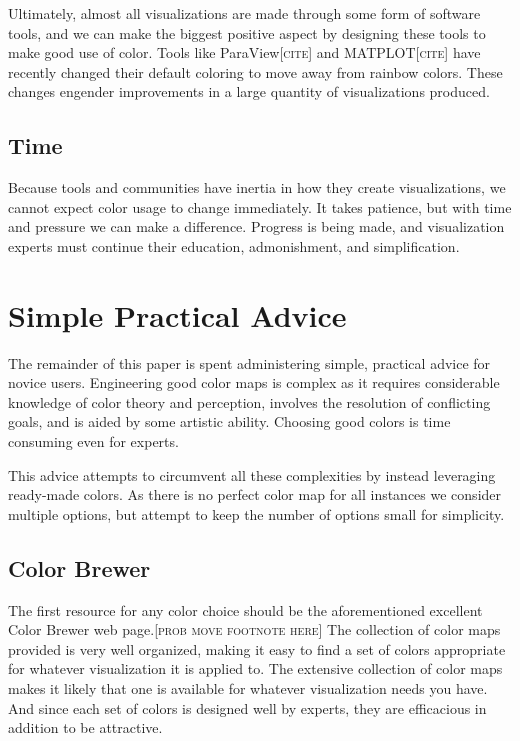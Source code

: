 \documentclass[letterpaper,twocolumn,fleqn]{article}
\newcommand{\fix}[1]{{\color{red}\textsc{[#1]}}}
\begin{document}
Ultimately, almost all visualizations are made through some form of
software tools, and we can make the biggest positive aspect by designing
these tools to make good use of color. Tools like ParaView\fix{cite} and
MATPLOT\fix{cite} have recently changed their default coloring to move away
from rainbow colors. These changes engender improvements in a large
quantity of visualizations produced.

\subsection{Time}

\noindent
Because tools and communities have inertia in how they create
visualizations, we cannot expect color usage to change immediately. It
takes patience, but with time and pressure we can make a difference.
Progress is being made, and visualization experts must continue their
education, admonishment, and simplification.


\section{Simple Practical Advice}

The remainder of this paper is spent administering simple, practical advice
for novice users. Engineering good color maps is complex as it requires
considerable knowledge of color theory and perception, involves the
resolution of conflicting goals, and is aided by some artistic ability.
Choosing good colors is time consuming even for experts.

This advice attempts to circumvent all these complexities by instead
leveraging ready-made colors. As there is no perfect color map for all
instances we consider multiple options, but attempt to keep the number of
options small for simplicity.

\subsection{Color Brewer}

\noindent
The first resource for any color choice should be the aforementioned
excellent Color Brewer web page.\fix{prob move footnote here} The
collection of color maps provided is very well organized, making it easy to
find a set of colors appropriate for whatever visualization it is applied
to. The extensive collection of color maps makes it likely that one is
available for whatever visualization needs you have. And since each set of
colors is designed well by experts, they are efficacious in addition to be
attractive.
\end{document}
